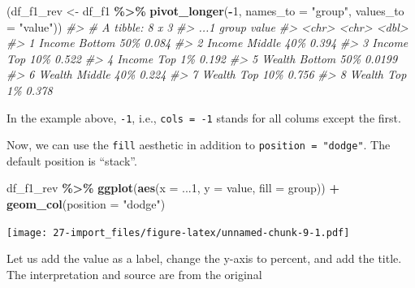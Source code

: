 \documentclass[
  xelatex, ja=standard]{bxjsbook}
\newenvironment{Shaded}{\begin{snugshade}}{\end{snugshade}}
\newcommand{\AttributeTok}[1]{\textcolor[rgb]{0.13,0.29,0.53}{#1}}
\newcommand{\CommentTok}[1]{\textcolor[rgb]{0.56,0.35,0.01}{\textit{#1}}}
\newcommand{\DecValTok}[1]{\textcolor[rgb]{0.00,0.00,0.81}{#1}}
\newcommand{\FunctionTok}[1]{\textcolor[rgb]{0.13,0.29,0.53}{\textbf{#1}}}
\newcommand{\NormalTok}[1]{#1}
\newcommand{\OtherTok}[1]{\textcolor[rgb]{0.56,0.35,0.01}{#1}}
\newcommand{\SpecialCharTok}[1]{\textcolor[rgb]{0.81,0.36,0.00}{\textbf{#1}}}
\newcommand{\StringTok}[1]{\textcolor[rgb]{0.31,0.60,0.02}{#1}}
\theoremstyle{definition}
\theoremstyle{definition}
\theoremstyle{definition}
\theoremstyle{definition}
\theoremstyle{remark}
\begin{document}
\begin{Shaded}
\begin{Highlighting}[]
\NormalTok{(df\_f1\_rev }\OtherTok{\textless{}{-}}\NormalTok{ df\_f1 }\SpecialCharTok{\%\textgreater{}\%} \FunctionTok{pivot\_longer}\NormalTok{(}\SpecialCharTok{{-}}\DecValTok{1}\NormalTok{, }\AttributeTok{names\_to =} \StringTok{"group"}\NormalTok{, }\AttributeTok{values\_to =} \StringTok{"value"}\NormalTok{))}
\CommentTok{\#\textgreater{} \# A tibble: 8 x 3}
\CommentTok{\#\textgreater{}   ...1   group       value}
\CommentTok{\#\textgreater{}   \textless{}chr\textgreater{}  \textless{}chr\textgreater{}       \textless{}dbl\textgreater{}}
\CommentTok{\#\textgreater{} 1 Income Bottom 50\% 0.084 }
\CommentTok{\#\textgreater{} 2 Income Middle 40\% 0.394 }
\CommentTok{\#\textgreater{} 3 Income Top 10\%    0.522 }
\CommentTok{\#\textgreater{} 4 Income Top 1\%     0.192 }
\CommentTok{\#\textgreater{} 5 Wealth Bottom 50\% 0.0199}
\CommentTok{\#\textgreater{} 6 Wealth Middle 40\% 0.224 }
\CommentTok{\#\textgreater{} 7 Wealth Top 10\%    0.756 }
\CommentTok{\#\textgreater{} 8 Wealth Top 1\%     0.378}
\end{Highlighting}
\end{Shaded}

In the example above, \texttt{-1}, i.e., \texttt{cols\ =\ -1} stands for all colums except the first.

Now, we can use the \texttt{fill} aesthetic in addition to \texttt{position\ =\ "dodge"}. The default position is ``stack''.

\begin{Shaded}
\begin{Highlighting}[]
\NormalTok{df\_f1\_rev }\SpecialCharTok{\%\textgreater{}\%} 
  \FunctionTok{ggplot}\NormalTok{(}\FunctionTok{aes}\NormalTok{(}\AttributeTok{x =}\NormalTok{ ...}\DecValTok{1}\NormalTok{, }\AttributeTok{y =}\NormalTok{ value, }\AttributeTok{fill =}\NormalTok{ group)) }\SpecialCharTok{+}
  \FunctionTok{geom\_col}\NormalTok{(}\AttributeTok{position =} \StringTok{"dodge"}\NormalTok{)}
\end{Highlighting}
\end{Shaded}

\texttt{[image: 27-import\_files/figure-latex/unnamed-chunk-9-1.pdf]}

Let us add the value as a label, change the y-axis to percent, and add the title. The interpretation and source are from the original
\end{document}
